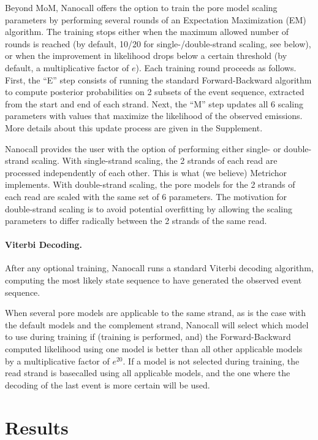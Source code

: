 \documentclass{bioinfo}
\begin{document}
\begin{methods}
Beyond MoM, Nanocall offers the option to train the pore model scaling parameters by performing several rounds of an Expectation Maximization (EM) algorithm. The training stops either when the maximum allowed number of rounds is reached (by default, 10/20 for single-/double-strand scaling, see below), or when the improvement in likelihood drops below a certain threshold (by default, a multiplicative factor of $e$). Each training round proceeds as follows. First, the ``E'' step consists of running the standard Forward-Backward algorithm to compute posterior probabilities on 2 subsets of the event sequence, extracted from the start and end of each strand. Next, the ``M'' step updates all 6 scaling parameters with values that maximize the likelihood of the observed emissions. More details about this update process are given in the Supplement.

Nanocall provides the user with the option of performing either single- or double- strand scaling. With single-strand scaling, the 2 strands of each read are processed independently of each other. This is what (we believe) Metrichor implements. With double-strand scaling, the pore models for the 2 strands of each read are scaled with the same set of 6 parameters. The motivation for double-strand scaling is to avoid potential overfitting by allowing the scaling parameters to differ radically between the 2 strands of the same read.

\paragraph{Viterbi Decoding.}
After any optional training, Nanocall runs a standard Viterbi decoding algorithm, computing the most likely state sequence to have generated the observed event sequence.

When several pore models are applicable to the same strand, as is the case with the default models and the complement strand, Nanocall will select which model to use during training if (training is performed, and) the Forward-Backward computed likelihood using one model is better than all other applicable models by a multiplicative factor of $e^{20}$. If a model is not selected during training, the read strand is basecalled using all applicable models, and the one where the decoding of the last event is more certain will be used.

\end{methods}

\section{Results}
\end{document}

